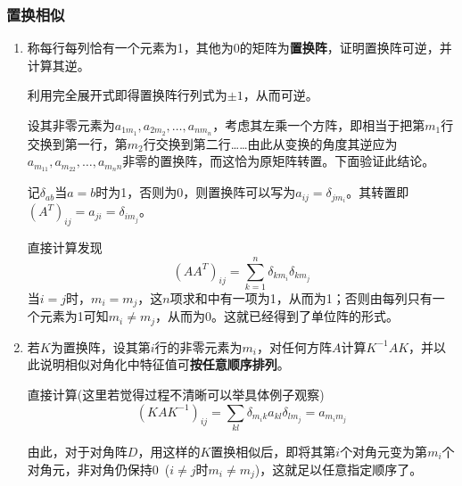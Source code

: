 \documentclass[a4paper,UTF8,fontset=windows]{ctexart}
\begin{document}
\subsubsection{置换相似}
\begin{enumerate}
    \item 称每行每列恰有一个元素为1，其他为0的矩阵为\textbf{置换阵}，证明置换阵可逆，并计算其逆。
    
    利用完全展开式即得置换阵行列式为$\pm1$，从而可逆。

    设其非零元素为$a_{1m_1},a_{2m_2},\dots,a_{nm_n}$，考虑其左乘一个方阵，即相当于把第$m_1$行交换到第一行，第$m_2$行交换到第二行……由此从变换的角度其逆应为$a_{m_11},a_{m_22},\dots,a_{m_nn}$非零的置换阵，而这恰为原矩阵转置。下面验证此结论。

    记$\delta_{ab}$当$a=b$时为1，否则为0，则置换阵可以写为$a_{ij}=\delta_{jm_i}$。其转置即$(A^T)_{ij}=a_{ji}=\delta_{im_j}$。

    直接计算发现
    $$(AA^T)_{ij}=\sum_{k=1}^n\delta_{km_i}\delta_{km_j}$$
    当$i=j$时，$m_i=m_j$，这$n$项求和中有一项为1，从而为1；否则由每列只有一个元素为1可知$m_i\ne m_j$，从而为0。这就已经得到了单位阵的形式。

    \item 若$K$为置换阵，设其第$i$行的非零元素为$m_i$，对任何方阵$A$计算$K^{-1}AK$，并以此说明相似对角化中特征值可\textbf{按任意顺序排列}。
    
    直接计算(这里若觉得过程不清晰可以举具体例子观察)
    $$(KAK^{-1})_{ij}=\sum_{kl}\delta_{m_ik}a_{kl}\delta_{lm_j}=a_{m_im_j}$$

    由此，对于对角阵$D$，用这样的$K$置换相似后，即将其第$i$个对角元变为第$m_i$个对角元，非对角仍保持0\ ($i\ne j$时$m_i\ne m_j$)，这就足以任意指定顺序了。
\end{enumerate}
\end{document}
